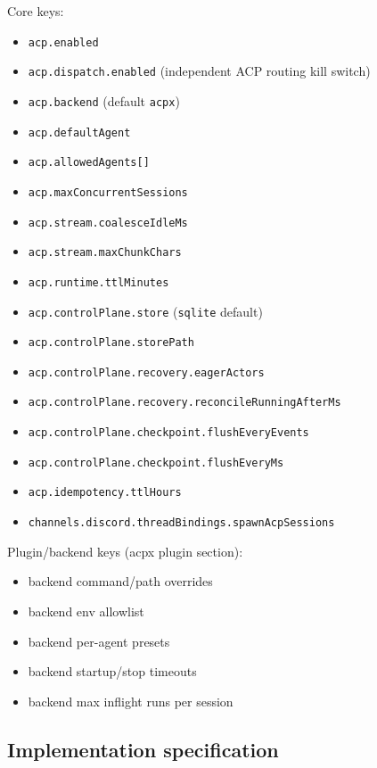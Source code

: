 Core keys:

\begin{itemize}
  \item \texttt{acp.enabled}
  \item \texttt{acp.dispatch.enabled} (independent ACP routing kill switch)
  \item \texttt{acp.backend} (default \texttt{acpx})
  \item \texttt{acp.defaultAgent}
  \item \texttt{acp.allowedAgents[]}
  \item \texttt{acp.maxConcurrentSessions}
  \item \texttt{acp.stream.coalesceIdleMs}
  \item \texttt{acp.stream.maxChunkChars}
  \item \texttt{acp.runtime.ttlMinutes}
  \item \texttt{acp.controlPlane.store} (\texttt{sqlite} default)
  \item \texttt{acp.controlPlane.storePath}
  \item \texttt{acp.controlPlane.recovery.eagerActors}
  \item \texttt{acp.controlPlane.recovery.reconcileRunningAfterMs}
  \item \texttt{acp.controlPlane.checkpoint.flushEveryEvents}
  \item \texttt{acp.controlPlane.checkpoint.flushEveryMs}
  \item \texttt{acp.idempotency.ttlHours}
  \item \texttt{channels.discord.threadBindings.spawnAcpSessions}
\end{itemize}


Plugin/backend keys (acpx plugin section):

\begin{itemize}
  \item backend command/path overrides
  \item backend env allowlist
  \item backend per-agent presets
  \item backend startup/stop timeouts
  \item backend max inflight runs per session
\end{itemize}


\subsection{Implementation specification}


